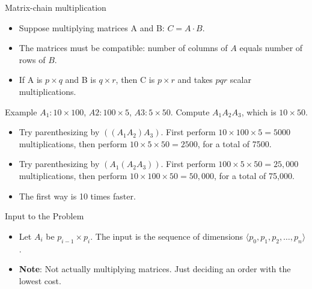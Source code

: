 \documentclass[aspectratio=169]{beamer}
\begin{document}
\begin{frame}{Matrix-chain multiplication}
    \begin{itemize}
        \item Suppose multiplying matrices A and B: $C = A \cdot B$.
        \item The matrices must be compatible: number of columns of $A$ equals number of rows of $B$.
        \item If A is $p \times q$ and B is $q \times r$, then C is $p \times r$ and takes $pqr$ scalar multiplications.
    \end{itemize}
\end{frame}

\begin{frame}{Example}
    $A_1: 10 \times 100$, $A2: 100 \times 5$, $A3: 5 \times 50$. Compute $A_1 A_2 A_3$, which is $10 \times 50$.
    \begin{itemize}
        \item Try parenthesizing by $((A_1 A_2) A_3)$. First perform $10 \times 100 \times 5 = 5000$ multiplications, then perform $10 \times 5 \times 50 = 2500$, for a total of 7500.
        \item Try parenthesizing by $(A_1 (A_2 A_3))$. First perform $100 \times 5 \times 50 = 25,000$ multiplications, then perform $10 \times 100 \times 50 = 50,000$, for a total of 75,000.
        \item The ﬁrst way is 10 times faster.
    \end{itemize}
\end{frame}

\begin{frame}{Input to the Problem}
    \begin{itemize}
        \item Let $A_i$ be $p_{i - 1} \times p_i$. The input is the sequence of dimensions $\langle p_0, p_1, p_2, \ldots , p_n \rangle$.
        \item \textbf{Note}: Not actually multiplying matrices. Just deciding an order with the lowest cost.
    \end{itemize}
\end{frame}
\end{document}
